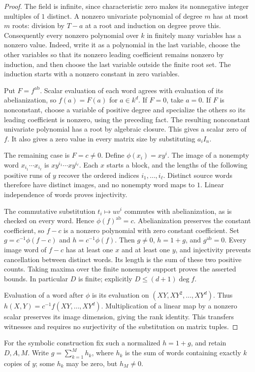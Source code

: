 \documentclass{article}
\newcommand{\ab}{\mathrm{ab}}
\begin{document}
\begin{proof}
The field is infinite, since characteristic zero makes its nonnegative integer multiples of $1$ distinct. A nonzero univariate polynomial of degree $m$ has at most $m$ roots: division by $T-a$ at a root and induction on degree prove this. Consequently every nonzero polynomial over $k$ in finitely many variables has a nonzero value. Indeed, write it as a polynomial in the last variable, choose the other variables so that its nonzero leading coefficient remains nonzero by induction, and then choose the last variable outside the finite root set. The induction starts with a nonzero constant in zero variables.

Put $F=f^{\ab}$. Scalar evaluation of each word agrees with evaluation of its abelianization, so $f(a)=F(a)$ for $a\in k^d$. If $F=0$, take $a=0$. If $F$ is nonconstant, choose a variable of positive degree and specialize the others so its leading coefficient is nonzero, using the preceding fact. The resulting nonconstant univariate polynomial has a root by algebraic closure. This gives a scalar zero of $f$. It also gives a zero value in every matrix size by substituting $a_iI_n$.

The remaining case is $F=c\ne0$. Define $\phi(x_i)=xy^i$. The image of a nonempty word $x_{i_1}\cdots x_{i_\ell}$ is
$xy^{i_1}\cdots xy^{i_\ell}$. Each $x$ starts a block, and the lengths of the following positive runs of $y$ recover the ordered indices $i_1,\ldots,i_\ell$. Distinct source words therefore have distinct images, and no nonempty word maps to $1$. Linear independence of words proves injectivity.

The commutative substitution $t_i\mapsto uv^i$ commutes with abelianization, as is checked on every word. Hence $\phi(f)^{\ab}=c$. Abelianization preserves the constant coefficient, so $f-c$ is a nonzero polynomial with zero constant coefficient. Set $g=c^{-1}\phi(f-c)$ and $h=c^{-1}\phi(f)$. Then $g\ne0$, $h=1+g$, and $g^{\ab}=0$. Every image word of $f-c$ has at least one $x$ and at least one $y$, and injectivity prevents cancellation between distinct words. Its length is the sum of these two positive counts. Taking maxima over the finite nonempty support proves the asserted bounds. In particular $D$ is finite; explicitly $D\leq(d+1)\deg f$.

Evaluation of a word after $\phi$ is its evaluation on $(XY,XY^2,\ldots,XY^d)$. Thus $h(X,Y)=c^{-1}f(XY,\ldots,XY^d)$. Multiplication of a linear map by a nonzero scalar preserves its image dimension, giving the rank identity. This transfers witnesses and requires no surjectivity of the substitution on matrix tuples.
\end{proof}
For the symbolic construction fix such a normalized $h=1+g$, and retain $D,A,M$. Write $g=\sum_{k=1}^M h_k$, where $h_k$ is the sum of words containing exactly $k$ copies of $y$; some $h_k$ may be zero, but $h_M\ne0$.
\end{document}
